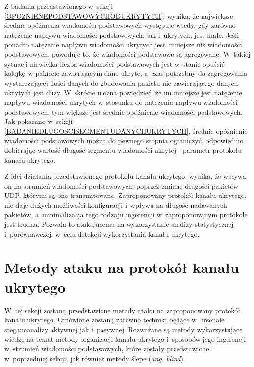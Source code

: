 \documentclass[a4paper, twoside, 12pt]{report}
\begin{document}
        Z badania przedstawionego w~sekcji \ref{OPOZNIENEPODSTAWOWYCHODUKRYTYCH},
        wynika, że największe średnie opóźnienia wiadomości podstawowych
        występuje wtedy, gdy zarówno natężenie napływu wiadomości podstawowych, jak i~ukrytych, jest małe.
        Jeśli ponadto natężenie napływu wiadomości ukrytych jest mniejsze niż wiadomości podstawowych,
        powoduje to, że wiadomości podstawowe są agregowane.
        W~takiej sytuacji niewielka liczba wiadomości podstawowych jest w~stanie
        opuścić kolejkę w pakiecie zawierającym dane ukryte, a~czas potrzebny do
        zagregowania wystarczającej ilości danych do zbudowania pakietu nie
        zawierającego danych ukrytych jest duży. W~skrócie można powiedzieć, że
        im mniejsze jest natężenie napływu wiadomości ukrytych w~stosunku do natężenia
        napływu wiadomości podstawowych, tym większe jest średnie opóźnienie wiadomości podstawowych.
        Jak pokazano w~sekcji \ref{BADANIEDLUGOSCISEGMENTUDANYCHUKRYTYCH},
        średnie opóźnienie wiadomości podstawowych można do pewnego stopnia ograniczyć, odpowiednio
        dobierając wartość długość segmentu wiadomości ukrytej - parametr protokołu
        kanału ukrytego.

        Z idei działania przedstawionego protokołu kanału ukrytego, wynika, że wpływa on na strumień
        wiadomości podstawowych, poprzez zmianę długości pakietów UDP, którymi są one transmitowane.
        Zaproponowany protokół kanału ukrytego, nie daje dużych możliwości konfiguracji i~wpływu
        na długość nadawanych pakietów, a~minimalizacja tego rodzaju ingerencji
        w~zaproponowanym protokole jest trudna. Pozwala to atakującemu
        na wykorzystanie analizy statystycznej i~porównawczej, w~celu detekcji
        wykorzystania kanału ukrytego.

    \section{Metody ataku na protokół kanału ukrytego}
       W~tej sekcji zostaną przedstawione metody ataku na zaproponowany protokół kanału ukrytego. Omówione
       zostaną zarówno techniki będące w~arsenale steganoanalizy aktywnej jak
       i~pasywnej. Rozważane są metody wykorzystujące wiedzę na temat metody organizacji kanału ukrytego
       i~sposobów jego ingerencji w~strumień wiadomości podstawowych, które zostały
       przedstawione w~poprzedniej sekcji, jak również metody ślepe (\emph{ang. blind}).
\end{document}
